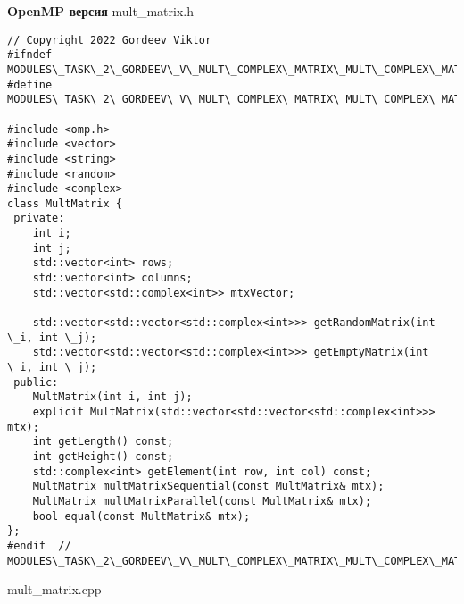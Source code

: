 \documentclass{report}
\begin{document}
\textbf{OpenMP версия}
\newline
\newline mult\_matrix.h
\begin{lstlisting}
// Copyright 2022 Gordeev Viktor
#ifndef MODULES\_TASK\_2\_GORDEEV\_V\_MULT\_COMPLEX\_MATRIX\_MULT\_COMPLEX\_MATRIX\_H\_
#define MODULES\_TASK\_2\_GORDEEV\_V\_MULT\_COMPLEX\_MATRIX\_MULT\_COMPLEX\_MATRIX\_H\_

#include <omp.h>
#include <vector>
#include <string>
#include <random>
#include <complex>
class MultMatrix {
 private:
    int i;
    int j;
    std::vector<int> rows;
    std::vector<int> columns;
    std::vector<std::complex<int>> mtxVector;

    std::vector<std::vector<std::complex<int>>> getRandomMatrix(int \_i, int \_j);
    std::vector<std::vector<std::complex<int>>> getEmptyMatrix(int \_i, int \_j);
 public:
    MultMatrix(int i, int j);
    explicit MultMatrix(std::vector<std::vector<std::complex<int>>> mtx);
    int getLength() const;
    int getHeight() const;
    std::complex<int> getElement(int row, int col) const;
    MultMatrix multMatrixSequential(const MultMatrix& mtx);
    MultMatrix multMatrixParallel(const MultMatrix& mtx);
    bool equal(const MultMatrix& mtx);
};
#endif  // MODULES\_TASK\_2\_GORDEEV\_V\_MULT\_COMPLEX\_MATRIX\_MULT\_COMPLEX\_MATRIX\_H\_

\end{lstlisting}
mult\_matrix.cpp
\end{document}
